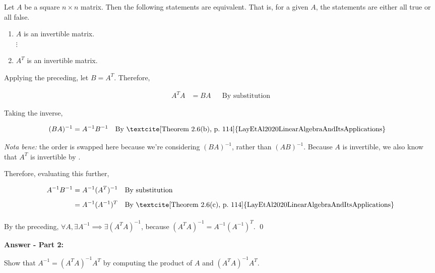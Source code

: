 \documentclass[10pt,letterpaper,final]{report}
\newcommand{\reason}[1]{&& \text{#1}}
\begin{document}
\begin{tcolorbox}[colback=blue!10!white, colframe=blue!10!black, title={Theorem 2.8(a,l) - Invertible Matrix Theorem}]
  Let $A$ be a square $n \times n$ matrix. Then the following statements are equivalent. That is, for a given $A$, the statements are either all true or all false.
  \begin{enumerate}[label=\alph*.]
    \item $A$ is an invertible matrix.
          \\$\vdots$
          \setcounter{enumi}{11}
    \item $A^T$ is an invertible matrix.
  \end{enumerate}
\end{tcolorbox}

Applying the preceding, let $B = A^T$. Therefore,

\begin{align*}
  A^T A & = BA \reason{By substitution}
\end{align*}

Taking the inverse,

\begin{align*}
  (BA)^{-1} & = A^{-1}B^{-1} \reason{By \textcite[Theorem 2.6(b), p.~114]{LayEtAl2020LinearAlgebraAndItsApplications}}
\end{align*}

\emph{Nota bene:} the order is swapped here because we're considering $(BA)^{-1}$, rather than $(AB)^{-1}$. Because $A$ is invertible, we also know that $A^T$ is invertible by \textcite[Theorem 2.6(c), p.~114]{LayEtAl2020LinearAlgebraAndItsApplications}.

Therefore, evaluating this further,

\begin{align*}
  A^{-1}B^{-1} & = A^{-1}(A^T)^{-1} \reason{By substitution}                                                                  \\[1ex]
               & = A^{-1}(A^{-1})^T \reason{By \textcite[Theorem 2.6(c), p.~114]{LayEtAl2020LinearAlgebraAndItsApplications}} \\[1ex]
\end{align*}

By the preceding, $\forall A, \exists A^{-1} \implies \exists (A^T A)^{-1}$, because $(A^T A)^{-1} = A^{-1}(A^{-1})^T$. \qed

\medskip
\noindent\textbf{Answer - Part 2:}
\medskip


Show that $A^{-1} = (A^T A)^{-1} A^T$ by computing the product of $A$ and $(A^T A)^{-1} A^T$.
\end{document}
